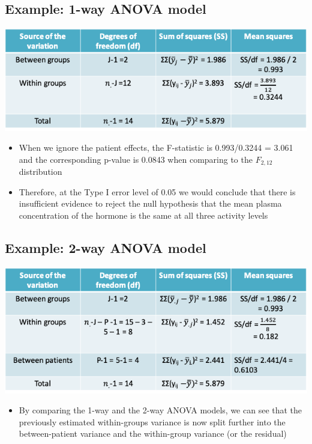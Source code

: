 \documentclass[
]{book}
\providecommand{\tightlist}{%
  \setlength{\itemsep}{0pt}\setlength{\parskip}{0pt}}
\begin{document}
\hypertarget{example-1-way-anova-model}{%
\subsection{Example: 1-way ANOVA model}\label{example-1-way-anova-model}}

\includegraphics[width=1\linewidth]{./11_16}

\begin{itemize}
\tightlist
\item
  When we ignore the patient effects, the F-statistic is 0.993/0.3244 = 3.061 and the corresponding p-value is 0.0843 when comparing to the \(F_{2,12}\) distribution
\item
  Therefore, at the Type I error level of 0.05 we would conclude that there is insufficient evidence to reject the null hypothesis that the mean plasma concentration of the hormone is the same at all three activity levels
\end{itemize}

\hypertarget{example-2-way-anova-model-1}{%
\subsection{Example: 2-way ANOVA model}\label{example-2-way-anova-model-1}}

\includegraphics[width=1\linewidth]{./11_17}

\begin{itemize}
\tightlist
\item
  By comparing the 1-way and the 2-way ANOVA models, we can see that the previously estimated within-groups variance is now split further into the between-patient variance and the within-group variance (or the residual)
\end{itemize}
\end{document}

